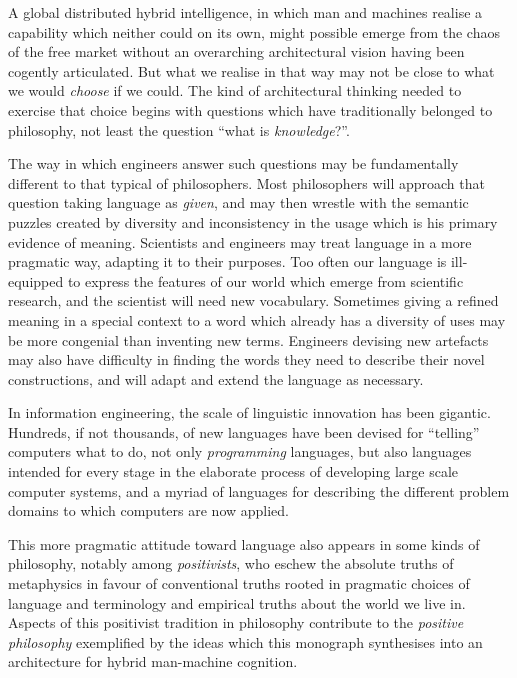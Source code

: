A global distributed hybrid intelligence, in which man and machines realise a capability which neither could on its own, might possible emerge from the chaos of the free market without an overarching architectural vision having been cogently articulated.
But what we realise in that way may not be close to what we would {\it choose} if we could.
The kind of architectural thinking needed to exercise that choice begins with questions which have traditionally belonged to philosophy, not least the question ``what is {\it knowledge}?''.

The way in which engineers answer such questions may be fundamentally different to that typical of philosophers.
Most philosophers will approach that question taking language as {\it given}, and may then wrestle with the semantic puzzles created by diversity and inconsistency in the usage which is his primary evidence of meaning.
Scientists and engineers may treat language in a more pragmatic way, adapting it to their purposes.
Too often our language is ill-equipped to express the features of our world which emerge from scientific research, and the scientist will need new vocabulary.
Sometimes giving a refined meaning in a special context to a word which already has a diversity of uses may be more congenial than inventing new terms.
Engineers devising new artefacts may also have difficulty in finding the words they need to describe their novel constructions, and will adapt and extend the language as necessary.

In information engineering, the scale of linguistic innovation has been gigantic.
Hundreds, if not thousands, of new languages have been devised for ``telling'' computers what to do, not only {\it programming} languages, but also languages intended for every stage in the elaborate process of developing large scale computer systems, and a myriad of languages for describing the different problem domains to which computers are now applied.

This more pragmatic attitude toward language also appears in some kinds of philosophy, notably among {\it positivists}, who eschew the absolute truths of metaphysics in favour of conventional truths rooted in pragmatic choices of language and terminology and empirical truths about the world we live in.
Aspects of this positivist tradition in philosophy contribute to the {\it positive philosophy} exemplified by the ideas which this monograph synthesises into an architecture for hybrid man-machine cognition.

\mainmatter
